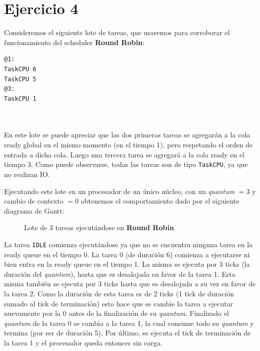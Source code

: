 \section{Ejercicio 4}

Consideremos el siguiente lote de tareas, que usaremos para corroborar el funcionamiento del scheduler \textbf{Round Robin}:

\begin{minipage}[t]{0.3\textwidth}
\begin{tarea}[H]
\begin{verbatim}
@1:
TaskCPU 6
TaskCPU 5
@3:
TaskCPU 1
\end{verbatim}\end{tarea}
\end{minipage}\\\\

En este lote se puede apreciar que las dos primeras tareas se agregarán a la cola ready global en el mismo momento (en el tiempo 1), pero respetando el orden de entrada a dicha cola. Luego una tercera tarea se agregará a la cola ready en el tiempo 3. Como puede observarse, todas las tareas son de tipo \texttt{TaskCPU}, ya que no realizan IO.

Ejecutando este lote en un procesador de un único núcleo, con un \textit{quantum} $= 3$ y cambio de contexto $= 0$ obtenemos el comportamiento dado por el siguiente diagrama de Gantt:


\begin{figure}[h!t]
  \centering
  \caption{Lote de 3 tareas ejecutándose en \textbf{Round Robin}}
  \label{fig:fig41}
\end{figure}

La tarea \texttt{IDLE} comienza ejecutándose ya que no se encuentra ninguna tarea en la ready queue en el tiempo 0. La tarea 0 (de duración 6) comienza a ejecutarse ni bien entra en la ready queue en el tiempo 1. La misma se ejecuta por 3 ticks (la duración del \textit{quantum}), hasta que es desalojada en favor de la tarea 1. Esta misma también se ejecuta por 3 ticks hasta que es desalojada a su vez en favor de la tarea 2. Como la duración de esta tarea es de 2 ticks (1 tick de duración sumado al tick de terminación) esto hace que se cambie la tarea a ejecutar nuevamente por la 0 antes de la finalización de su \textit{quantum}. Finalizado el \textit{quantum} de la tarea 0 se cambia a la tarea 1, la cual consume todo su \textit{quantum} y termina (por ser de duración 5). Por último, se ejecuta el tick de terminación de la tarea 1 y el procesador queda entonces sin carga.


